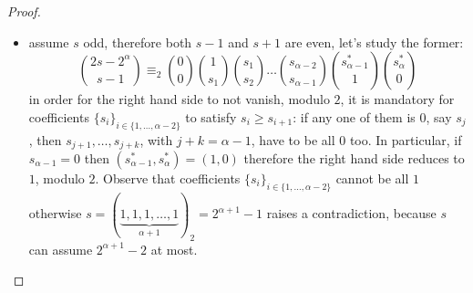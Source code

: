 \begin{proof}
\begin{itemize}
\begin{itemize}
            \item assume $s$ odd, therefore both $s-1$ and $s+1$ are even,
                let's study the former:
                \begin{displaymath}
                        {{2s-2^{{\alpha}}}\choose{s-1}}
                        \equiv_{2}
                        {{0}\choose{0}}
                        {{1}\choose{s_{1}}}
                        {{s_{1}}\choose{s_{2}}}
                        \ldots
                        {{s_{{\alpha}-2}}\choose{s_{{\alpha}-1}}}
                        {{s_{{\alpha}-1}^{*}}\choose{1}}
                        {{s_{{\alpha}}^{*}}\choose{0}}
                \end{displaymath}
                in order for the right hand side to not vanish, modulo $2$,
                it is mandatory for coefficients $\lbrace s_{i}\rbrace_{i\in\lbrace1,\ldots,{\alpha}-2\rbrace}$
                to satisfy $s_{i}\geq s_{i+1}$: if any one of them is $0$, say $s_{j}$, then
                $s_{j+1},\ldots,s_{j+k}$, with $j+k={\alpha}-1$,
                have to be all $0$ too. In particular, if $s_{{\alpha}-1}=0$ then
                $(s_{{\alpha}-1}^{*},s_{{\alpha}}^{*})=(1,0)$
                therefore the right hand side reduces to $1$, modulo $2$.
                Observe that coefficients $\lbrace s_{i}\rbrace_{i\in\lbrace1,\ldots,{\alpha}-2\rbrace}$
                cannot be all $1$ otherwise
                $s=(\underbrace{1,1,1,\ldots,1}_{{\alpha}+1})_{2}=2^{{\alpha}+1}-1$ raises a contradiction, because
                $s$ can assume $2^{{\alpha}+1}-2$ at most.


\end{itemize}
\end{itemize}
\end{proof}
